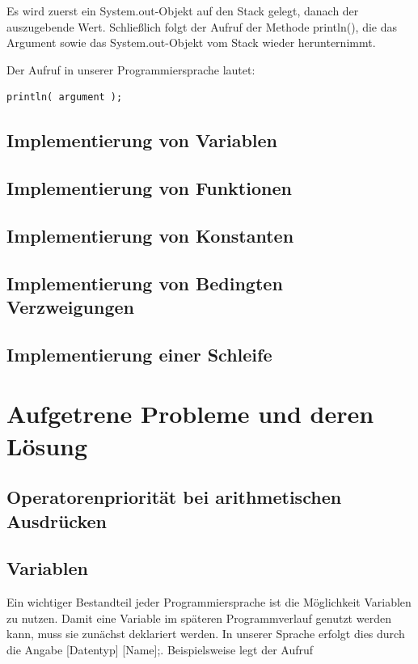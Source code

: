 \documentclass[12pt, a4paper, oneside, ngerman]{article}
\begin{document}
Es wird zuerst ein System.out-Objekt auf den Stack gelegt, danach der auszugebende Wert. Schließlich folgt der Aufruf der Methode println(), die das Argument sowie das System.out-Objekt vom Stack wieder herunternimmt.


Der Aufruf in unserer Programmiersprache lautet: 
\begin{lstlisting}[frame=single]
println( argument );
\end{lstlisting}

\subsection{Implementierung von Variablen}

\subsection{Implementierung von Funktionen}


\subsection{Implementierung von Konstanten}

\subsection{Implementierung von Bedingten Verzweigungen}

\subsection{Implementierung einer Schleife}




\pagebreak
\section{Aufgetrene Probleme und deren Lösung}

\subsection{Operatorenpriorität bei arithmetischen Ausdrücken}

\subsection{Variablen}
Ein wichtiger Bestandteil jeder Programmiersprache ist die Möglichkeit Variablen zu nutzen. Damit eine Variable im späteren Programmverlauf genutzt werden kann, muss sie zunächst deklariert werden. In unserer Sprache erfolgt dies durch die Angabe [Datentyp] [Name];. Beispielsweise legt der Aufruf
\end{document}
